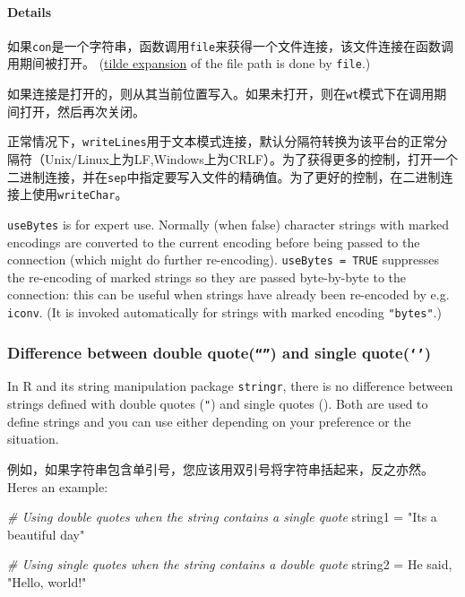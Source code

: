\documentclass[
]{article}
\newenvironment{Shaded}{}{}
\newcommand{\CommentTok}[1]{\textcolor[rgb]{0.38,0.63,0.69}{\textit{#1}}}
\newcommand{\NormalTok}[1]{#1}
\newcommand{\OtherTok}[1]{\textcolor[rgb]{0.00,0.44,0.13}{#1}}
\newcommand{\StringTok}[1]{\textcolor[rgb]{0.25,0.44,0.63}{#1}}
\begin{document}
\hypertarget{details}{%
\paragraph{Details}\label{details}}

如果\texttt{con}是一个字符串，函数调用\texttt{file}来获得一个文件连接，该文件连接在函数调用期间被打开。
(\href{vscode-webview://00i87qrgljff0t3jmc9gjufilst9usetvkh9gn773om0ic67o1j2/base/help/tilde\%20expansion}{tilde
expansion} of the file path is done by \texttt{file}.)

如果连接是打开的，则从其当前位置写入。如果未打开，则在\texttt{wt}模式下在调用期间打开，然后再次关闭。

正常情况下，\texttt{writeLines}用于文本模式连接，默认分隔符转换为该平台的正常分隔符（Unix/Linux上为LF,Windows上为CRLF）。为了获得更多的控制，打开一个二进制连接，并在\texttt{sep}中指定要写入文件的精确值。为了更好的控制，在二进制连接上使用\texttt{writeChar}。

\texttt{useBytes} is for expert use. Normally (when false) character
strings with marked encodings are converted to the current encoding
before being passed to the connection (which might do further
re-encoding). \texttt{useBytes\ =\ TRUE} suppresses the re-encoding of
marked strings so they are passed byte-by-byte to the connection: this
can be useful when strings have already been re-encoded by e.g.
\texttt{iconv}. (It is invoked automatically for strings with marked
encoding \texttt{"bytes"}.)

\hypertarget{difference-between-double-quote-and-single-quote}{%
\subsubsection{\texorpdfstring{Difference between double
quote(\texttt{“”}) and single
quote(\texttt{‘’})}{Difference between double quote(``\,'') and single quote(`\,')}}\label{difference-between-double-quote-and-single-quote}}

In R and its string manipulation package \texttt{stringr}, there is no
difference between strings defined with double quotes (\texttt{"}) and
single quotes (\texttt{\textquotesingle{}}). Both are used to define
strings and you can use either depending on your preference or the
situation.

例如，如果字符串包含单引号，您应该用双引号将字符串括起来，反之亦然。Here\textquotesingle s
an example:

\begin{Shaded}
\begin{Highlighting}[]
\CommentTok{\# Using double quotes when the string contains a single quote}
\NormalTok{string1 }\OtherTok{=} \StringTok{"It\textquotesingle{}s a beautiful day"}

\CommentTok{\# Using single quotes when the string contains a double quote}
\NormalTok{string2 }\OtherTok{=} \StringTok{\textquotesingle{}He said, "Hello, world!"\textquotesingle{}}
\end{Highlighting}
\end{Shaded}
\end{document}
